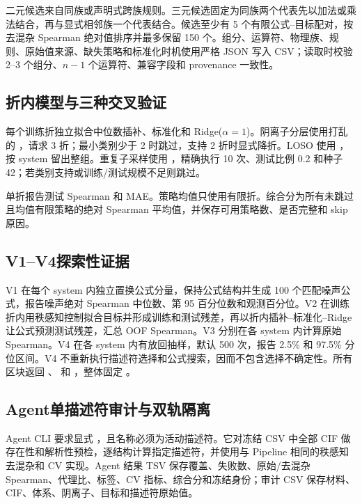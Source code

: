 二元候选来自同族或声明式跨族规则。三元候选固定为同族两个代表先以加法或乘法结合，再与显式相邻族一个代表结合。候选至少有 5 个有限公式--目标配对，按去混杂 Spearman 绝对值排序并最多保留 150 个。组分、运算符、物理族、规则、原始值来源、缺失策略和标准化时机使用严格 JSON 写入 CSV；读取时校验 2--3 个组分、$n-1$ 个运算符、兼容字段和 provenance 一致性。

\subsection{折内模型与三种交叉验证}

每个训练折独立拟合中位数插补、标准化和 Ridge($\alpha=1$)。阴离子分层使用打乱的 ，请求 3 折；最小类别少于 2 时跳过，支持 2 折时显式降折。LOSO 使用 ，按 system 留出整组。重复子采样使用 ，精确执行 10 次、测试比例 0.2 和种子 42；若类别支持或训练/测试规模不足则跳过。

单折报告测试 Spearman 和 MAE。策略均值只使用有限折。综合分为所有未跳过且均值有限策略的绝对 Spearman 平均值，并保存可用策略数、是否完整和 skip 原因。

\subsection{V1--V4探索性证据}

V1 在每个 system 内独立置换公式分量，保持公式结构并生成 100 个匹配噪声公式，报告噪声绝对 Spearman 中位数、第 95 百分位数和观测百分位。V2 在训练折内用秩感知控制拟合目标并形成训练和测试残差，再以折内插补--标准化--Ridge 让公式预测测试残差，汇总 OOF Spearman。V3 分别在各 system 内计算原始 Spearman。V4 在各 system 内有放回抽样，默认 500 次，报告 2.5\% 和 97.5\% 分位区间。V4 不重新执行描述符选择和公式搜索，因而不包含选择不确定性。所有区块返回 、 和 ，整体固定 。

\subsection{Agent单描述符审计与双轨隔离}

Agent CLI 要求显式 ，且名称必须为活动描述符。它对冻结 CSV 中全部 CIF 做存在性和解析性预检，逐结构计算指定描述符，并使用与 Pipeline 相同的秩感知去混杂和 CV 实现。Agent 结果 TSV 保存覆盖、失败数、原始/去混杂 Spearman、代理比、标签、CV 指标、综合分和冻结身份；审计 CSV 保存材料、CIF、体系、阴离子、目标和描述符原始值。

